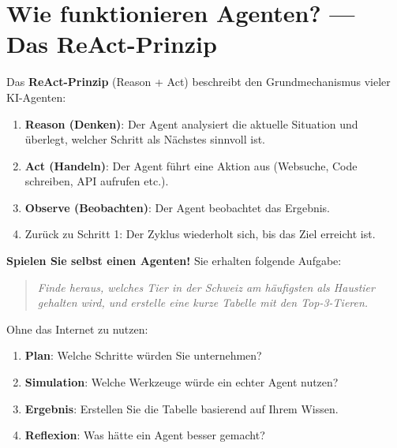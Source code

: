 \section{Wie funktionieren Agenten? --- Das ReAct-Prinzip}

\begin{mydefinition}
      Das \textbf{ReAct-Prinzip} (Reason + Act) beschreibt den Grundmechanismus
      vieler KI-Agenten:

      \begin{enumerate}
            \item \textbf{Reason (Denken)}: Der Agent analysiert die aktuelle Situation
                  und überlegt, welcher Schritt als Nächstes sinnvoll ist.
            \item \textbf{Act (Handeln)}: Der Agent führt eine Aktion aus (Websuche,
                  Code schreiben, API aufrufen etc.).
            \item \textbf{Observe (Beobachten)}: Der Agent beobachtet das Ergebnis.
            \item Zurück zu Schritt 1: Der Zyklus wiederholt sich, bis das Ziel erreicht ist.
      \end{enumerate}
\end{mydefinition}

\begin{myexercise}
      \textbf{Spielen Sie selbst einen Agenten!} Sie erhalten folgende Aufgabe:

      \begin{quote}
            \textit{Finde heraus, welches Tier in der Schweiz am häufigsten als
                  Haustier gehalten wird, und erstelle eine kurze Tabelle mit den Top-3-Tieren.}
      \end{quote}

      Ohne das Internet zu nutzen:
      \begin{enumerate}
            \item \textbf{Plan}: Welche Schritte würden Sie unternehmen?
            \item \textbf{Simulation}: Welche Werkzeuge würde ein echter Agent nutzen?
            \item \textbf{Ergebnis}: Erstellen Sie die Tabelle basierend auf Ihrem Wissen.
            \item \textbf{Reflexion}: Was hätte ein Agent besser gemacht?
      \end{enumerate}
\end{myexercise}

